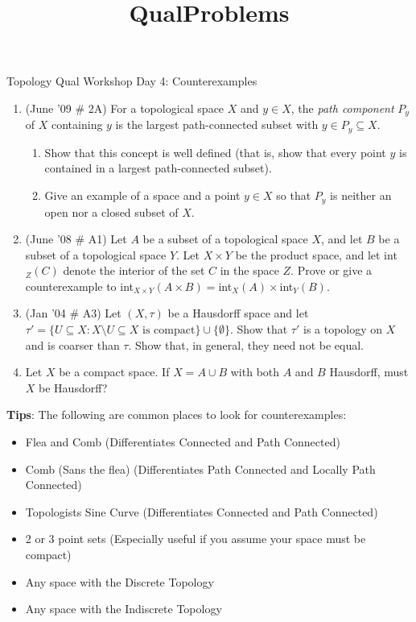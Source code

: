 \documentclass[psamsfonts, 11pt, reqno]{amsart}
\title{QualProblems}
\begin{document}
\begin{center}
\begin{large}
Topology Qual Workshop Day 4: Counterexamples
\end{large}
\end{center}
\vspace{.25in}

\begin{enumerate}
\item (June '09 \# 2A) For a topological space $X$ and $y \in X$, the \emph{path component} $P_y$ of $X$ containing
$y$ is the largest path-connected subset with $y \in P_y \subseteq X$.
\begin{enumerate}
\item Show that this concept is well defined (that is, show that every point $y$ is contained in a largest path-connected
subset).
\item Give an example of a space and a point $y \in X$ so that $P_y$ is neither an open nor a closed subset of $X$.
\end{enumerate}
\vfill


\item (June '08 \# A1) Let $A$ be a subset of a topological space $X$, and let $B$ be a subset of a topological space $Y$.
Let $X\times Y$ be the product space, and let int$_Z(C)$ denote the interior of the set $C$ in the space $Z$.  Prove
or give a counterexample to int$_{X \times Y}(A \times B) = $int$_X(A) \times$int$_Y(B)$.

\vfill

\item (Jan '04 \# A3) Let $(X, \tau)$ be a Hausdorff space and let $\tau ' = \{ U \subseteq X : X \setminus U \subseteq X
\mbox{ is compact} \} \cup \{ \emptyset \}$.  Show that $\tau '$ is a topology on $X$  and is coarser than $\tau$.
Show that, in general, they need not be equal.

\vfill

\item Let $X$ be a compact space.  If $X = A \cup B$ with both $A$ and $B$ Hausdorff, must $X$ be Hausdorff?

\vfill
\end{enumerate}
\textbf{Tips}: The following are common places to look for counterexamples: 
\begin{itemize}
\item Flea and Comb (Differentiates Connected and Path Connected)
\item Comb (Sans the flea) (Differentiates Path Connected and Locally Path Connected)
\item Topologists Sine Curve (Differentiates Connected and Path Connected)
\item 2 or 3 point sets (Especially useful if you assume your space must be compact)
\item Any space with the Discrete Topology
\item Any space with the Indiscrete Topology
\end{itemize}
\end{document}
